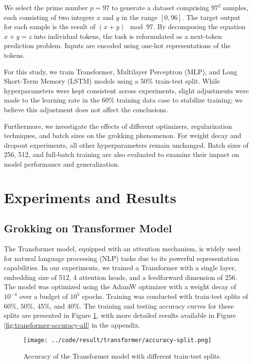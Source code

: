 \documentclass{article}
\begin{document}
We select the prime number $p = 97$ to generate a dataset comprising $97^2$ samples, each consisting of two integers $x$ and $y$ in the range $[0, 96]$. The target output for each sample is the result of $(x + y) \mod 97$. By decomposing the equation $x + y = z$ into individual tokens, the task is reformulated as a next-token prediction problem. Inputs are encoded using one-hot representations of the tokens.

For this study, we train Transformer, Multilayer Perceptron (MLP), and Long Short-Term Memory (LSTM) models using a $50\%$ train-test split. While hyperparameters were kept consistent across experiments, slight adjustments were made to the learning rate in the $60\%$ training data case to stabilize training; we believe this adjustment does not affect the conclusions. 

Furthermore, we investigate the effects of different optimizers, regularization techniques, and batch sizes on the grokking phenomenon. For weight decay and dropout experiments, all other hyperparameters remain unchanged. Batch sizes of 256, 512, and full-batch training are also evaluated to examine their impact on model performance and generalization.

\section{Experiments and Results}

\subsection{Grokking on Transformer Model}
The Transformer model, equipped with an attention mechanism, is widely used for natural language processing (NLP) tasks due to its powerful representation capabilities. In our experiments, we trained a Transformer with a single layer, embedding size of 512, 4 attention heads, and a feedforward dimension of 256. The model was optimized using the AdamW optimizer with a weight decay of $10^{-4}$ over a budget of $10^5$ epochs. Training was conducted with train-test splits of $60\%$, $50\%$, $45\%$, and $40\%$. The training and testing accuracy curves for these splits are presented in Figure \ref{fig:transformer-accuracy}, with more detailed results available in Figure \ref{fig:transformer-accuracy-all} in the appendix.

\begin{figure}[ht]
    \centering
    \texttt{[image: ../code/result/transformer/accuracy-split.png]}
    \caption{Accuracy of the Transformer model with different train-test splits.}
    \label{fig:transformer-accuracy}
\end{figure}
\end{document}

